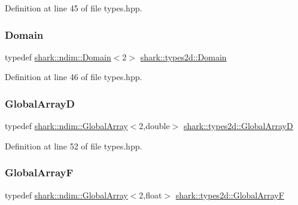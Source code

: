 Definition at line 45 of file types.\+hpp.

\hypertarget{namespaceshark_1_1types2d_add258bcfe2771656d368ea0823c24da2}{}\label{namespaceshark_1_1types2d_add258bcfe2771656d368ea0823c24da2} 
\subsubsection{\texorpdfstring{Domain}{Domain}}
{\footnotesize\ttfamily typedef \hyperlink{classshark_1_1ndim_1_1_domain}{shark\+::ndim\+::\+Domain}$<$2$>$ \hyperlink{namespaceshark_1_1types2d_add258bcfe2771656d368ea0823c24da2}{shark\+::types2d\+::\+Domain}}



Definition at line 46 of file types.\+hpp.

\hypertarget{namespaceshark_1_1types2d_a27c5f04d618bfd24d390ffe505258613}{}\label{namespaceshark_1_1types2d_a27c5f04d618bfd24d390ffe505258613} 
\subsubsection{\texorpdfstring{Global\+ArrayD}{GlobalArrayD}}
{\footnotesize\ttfamily typedef \hyperlink{classshark_1_1ndim_1_1_global_array}{shark\+::ndim\+::\+Global\+Array}$<$2,double$>$ \hyperlink{namespaceshark_1_1types2d_a27c5f04d618bfd24d390ffe505258613}{shark\+::types2d\+::\+Global\+ArrayD}}



Definition at line 52 of file types.\+hpp.

\hypertarget{namespaceshark_1_1types2d_ab94e32185533536da64b098df3482eab}{}\label{namespaceshark_1_1types2d_ab94e32185533536da64b098df3482eab} 
\subsubsection{\texorpdfstring{Global\+ArrayF}{GlobalArrayF}}
{\footnotesize\ttfamily typedef \hyperlink{classshark_1_1ndim_1_1_global_array}{shark\+::ndim\+::\+Global\+Array}$<$2,float$>$ \hyperlink{namespaceshark_1_1types2d_ab94e32185533536da64b098df3482eab}{shark\+::types2d\+::\+Global\+ArrayF}}



